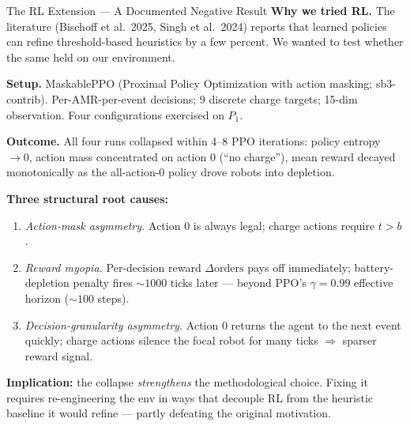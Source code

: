 \documentclass[aspectratio=169,10pt]{beamer}
\begin{document}
\begin{frame}{The RL Extension --- A Documented Negative Result}
  \footnotesize
  \textbf{Why we tried RL.} The literature (Bischoff et al.\ 2025, Singh et al.\ 2024) reports that learned policies can refine threshold-based heuristics by a few percent. We wanted to test whether the same held on our environment.

  \vspace{0.4em}
  \textbf{Setup.} MaskablePPO (Proximal Policy Optimization with action masking; sb3-contrib). Per-AMR-per-event decisions; 9 discrete charge targets; 15-dim observation. Four configurations exercised on $P_1$.

  \vspace{0.4em}
  \textbf{Outcome.} All four runs collapsed within 4--8 PPO iterations: policy entropy $\to 0$, action mass concentrated on action 0 (``no charge''), mean reward decayed monotonically as the all-action-0 policy drove robots into depletion.

  \vspace{0.4em}
  \textbf{Three structural root causes:}
  \begin{enumerate}
    \item \emph{Action-mask asymmetry.} Action 0 is always legal; charge actions require $t > b$.
    \item \emph{Reward myopia.} Per-decision reward $\Delta\text{orders}$ pays off immediately; battery-depletion penalty fires $\sim 1000$ ticks later --- beyond PPO's $\gamma = 0.99$ effective horizon ($\sim 100$ steps).
    \item \emph{Decision-granularity asymmetry.} Action 0 returns the agent to the next event quickly; charge actions silence the focal robot for many ticks $\Rightarrow$ sparser reward signal.
  \end{enumerate}

  \vspace{0.3em}
  \textbf{Implication:} the collapse \emph{strengthens} the methodological choice. Fixing it requires re-engineering the env in ways that decouple RL from the heuristic baseline it would refine --- partly defeating the original motivation.
\end{frame}
\end{document}
